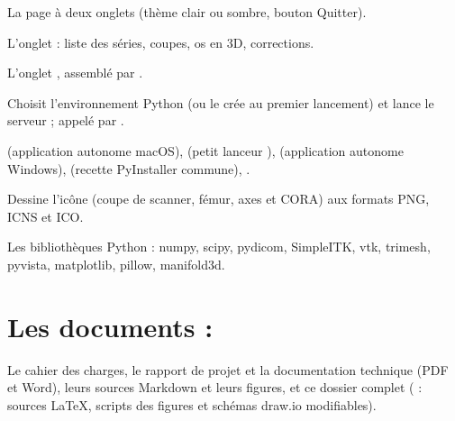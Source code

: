  La page à deux onglets (thème clair ou sombre, bouton Quitter).

 L'onglet  : liste des séries, coupes,
os en 3D, corrections.

 L'onglet , assemblé par
.

 Choisit l'environnement Python (ou le crée au premier lancement) et lance le serveur ;
appelé par .

  (application autonome macOS), 
(petit lanceur ),  (application autonome Windows),
 (recette PyInstaller commune), .

 Dessine l'icône (coupe de scanner, fémur, axes et CORA) aux formats PNG, ICNS
et ICO.

 Les bibliothèques Python : numpy, scipy, pydicom, SimpleITK, vtk, trimesh, pyvista,
matplotlib, pillow, manifold3d.

\section{Les documents : \texorpdfstring{}{documents/}}

Le cahier des charges, le rapport de projet et la documentation technique (PDF et Word), leurs sources Markdown et
leurs figures, et ce dossier complet ( : sources LaTeX, scripts des figures et
schémas draw.io modifiables).
